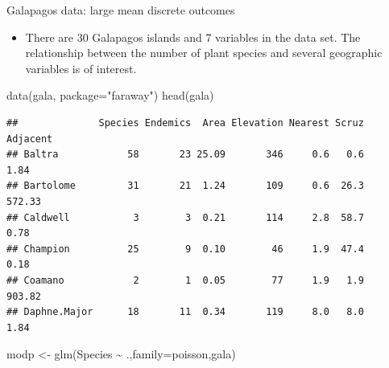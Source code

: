 \documentclass[
  ignorenonframetext,
]{beamer}
\newenvironment{Shaded}{\begin{snugshade}}{\end{snugshade}}
\newcommand{\AttributeTok}[1]{\textcolor[rgb]{0.77,0.63,0.00}{#1}}
\newcommand{\FunctionTok}[1]{\textcolor[rgb]{0.00,0.00,0.00}{#1}}
\newcommand{\NormalTok}[1]{#1}
\newcommand{\OtherTok}[1]{\textcolor[rgb]{0.56,0.35,0.01}{#1}}
\newcommand{\SpecialCharTok}[1]{\textcolor[rgb]{0.00,0.00,0.00}{#1}}
\newcommand{\StringTok}[1]{\textcolor[rgb]{0.31,0.60,0.02}{#1}}
\providecommand{\tightlist}{%
  \setlength{\itemsep}{0pt}\setlength{\parskip}{0pt}}
\begin{document}
\begin{frame}[fragile]{Galapagos data: large mean discrete outcomes}
\protect\hypertarget{galapagos-data-large-mean-discrete-outcomes}{}
\begin{itemize}
\tightlist
\item
  There are 30 Galapagos islands and 7 variables in the data set. The
  relationship between the number of plant species and several
  geographic variables is of interest.
\end{itemize}

\scriptsize

\begin{Shaded}
\begin{Highlighting}[]
\FunctionTok{data}\NormalTok{(gala, }\AttributeTok{package=}\StringTok{"faraway"}\NormalTok{)}
\FunctionTok{head}\NormalTok{(gala)}
\end{Highlighting}
\end{Shaded}

\begin{verbatim}
##              Species Endemics  Area Elevation Nearest Scruz Adjacent
## Baltra            58       23 25.09       346     0.6   0.6     1.84
## Bartolome         31       21  1.24       109     0.6  26.3   572.33
## Caldwell           3        3  0.21       114     2.8  58.7     0.78
## Champion          25        9  0.10        46     1.9  47.4     0.18
## Coamano            2        1  0.05        77     1.9   1.9   903.82
## Daphne.Major      18       11  0.34       119     8.0   8.0     1.84
\end{verbatim}

\begin{Shaded}
\begin{Highlighting}[]
\NormalTok{modp }\OtherTok{\textless{}{-}} \FunctionTok{glm}\NormalTok{(Species }\SpecialCharTok{\textasciitilde{}}\NormalTok{ .,}\AttributeTok{family=}\NormalTok{poisson,gala)}
\end{Highlighting}
\end{Shaded}
\end{frame}
\end{document}
